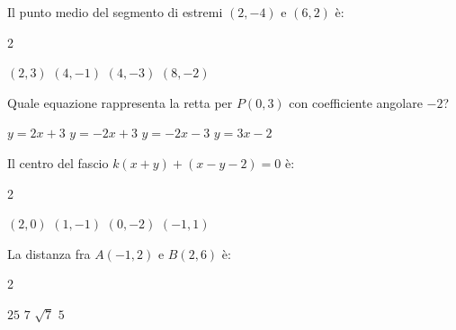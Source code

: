 \documentclass[a4paper,10pt]{exam}
\begin{document}
\begin{questions}
\question Il punto medio del segmento di estremi $(2,-4)$ e $(6,2)$ è:
\vspace{0.2em}
\begin{multicols}{2}
\begin{choices}
\choice $(2,3)$
\choice $(4,-1)$
\choice $(4,-3)$
\choice $(8,-2)$
\end{choices}
\end{multicols}

\question Quale equazione rappresenta la retta per $P(0,3)$ con coefficiente angolare $-2$?
\vspace{0.2em}
\begin{choices}
\choice $y=2x+3$
\choice $y=-2x+3$
\choice $y=-2x-3$
\choice $y=3x-2$
\end{choices}

\question Il centro del fascio $k(x+y)+(x-y-2)=0$ è:
\vspace{0.2em}
\begin{multicols}{2}
\begin{choices}
\choice $(2,0)$
\choice $(1,-1)$
\choice $(0,-2)$
\choice $(-1,1)$
\end{choices}
\end{multicols}

\question La distanza fra $A(-1,2)$ e $B(2,6)$ è:
\vspace{0.2em}
\begin{multicols}{2}
\begin{choices}
\choice $25$
\choice $7$
\choice $\sqrt{7}$
\choice $5$
\end{choices}
\end{multicols}

\end{questions}
\end{document}
